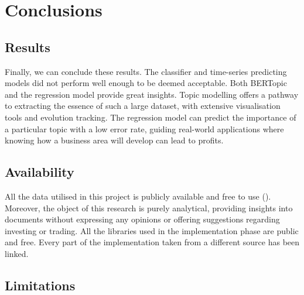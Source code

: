 \documentclass[12pt,MSc,a4paper,oneside]{muthesis}
\begin{document}
    \chapter{Conclusions}

    \section{Results}

    Finally, we can conclude these results. The classifier and time-series predicting models did not perform well enough to be deemed acceptable. Both BERTopic and the regression model provide great insights. Topic modelling offers a pathway to extracting the essence of such a large dataset, with extensive visualisation tools and evolution tracking. The regression model can predict the importance of a particular topic with a low error rate, guiding real-world applications where knowing how a business area will develop can lead to profits.

    \section{Availability}

    All the data utilised in this project is publicly available and free to use (\cite{sec-data-policy}). Moreover, the object of this research is purely analytical, providing insights into documents without expressing any opinions or offering suggestions regarding investing or trading. All the libraries used in the implementation phase are public and free. Every part of the implementation taken from a different source has been linked.

    \section{Limitations}
\end{document}
